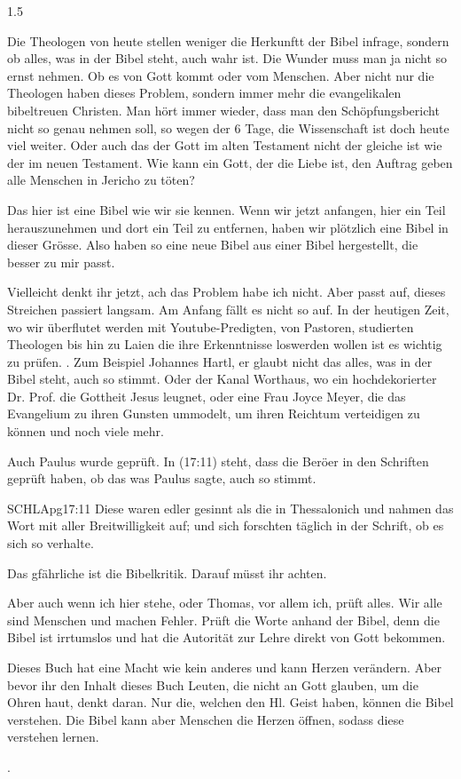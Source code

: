 \documentclass[fontsize=14pt]{mybib}
\begin{document}
\begin{spacing}{1.5}
\begin{otsblock}[Einführung]
    Die Theologen von heute stellen weniger die Herkunftt der Bibel infrage, sondern ob alles, was in der Bibel steht, auch wahr ist. Die Wunder muss man ja nicht so ernst nehmen. Ob es von Gott kommt oder vom Menschen. Aber nicht nur die Theologen haben dieses Problem, sondern immer mehr die evangelikalen bibeltreuen Christen. Man hört immer wieder, dass man den Schöpfungsbericht nicht so genau nehmen soll, so wegen der 6 Tage, die Wissenschaft ist doch heute viel weiter. Oder auch das der Gott im alten Testament nicht der gleiche ist wie der im neuen Testament. Wie kann ein Gott, der die Liebe ist, den Auftrag geben alle Menschen in Jericho zu töten?

    Das hier ist eine Bibel wie wir sie kennen. Wenn wir jetzt anfangen, hier ein Teil herauszunehmen und dort ein Teil zu entfernen, haben wir plötzlich eine Bibel in dieser Grösse. Also haben so eine neue Bibel aus einer Bibel hergestellt, die  besser zu mir passt.
    
    Vielleicht denkt ihr jetzt, ach das Problem habe ich nicht. Aber passt auf, dieses Streichen passiert langsam. Am Anfang fällt es nicht so auf. In der heutigen Zeit, wo wir überflutet werden mit Youtube-Predigten, von Pastoren,  studierten Theologen bis hin zu Laien die ihre Erkenntnisse loswerden wollen ist es wichtig zu prüfen. . Zum Beispiel Johannes Hartl, er glaubt nicht das alles, was in der Bibel steht, auch so stimmt. Oder der Kanal Worthaus, wo ein hochdekorierter Dr. Prof. die Gottheit Jesus leugnet, oder eine Frau Joyce Meyer, die das Evangelium zu ihren Gunsten ummodelt, um ihren Reichtum verteidigen zu können und noch viele mehr. 

    Auch Paulus wurde geprüft. In (17:11) steht, dass die Beröer in den Schriften geprüft haben, ob das was Paulus sagte, auch so stimmt.

    \begin{bibelbox}{SCHL}{Apg}{17:11}
    Diese waren edler gesinnt als die in Thessalonich und nahmen das Wort mit aller Breitwilligkeit auf; und sich forschten täglich in der Schrift, ob es sich so verhalte.
    \end{bibelbox}

    Das gfährliche ist die Bibelkritik. Darauf müsst ihr achten.
    
    Aber auch wenn ich hier stehe, oder Thomas, vor allem ich, prüft alles. Wir alle sind Menschen und machen Fehler. Prüft die Worte anhand der Bibel, denn die Bibel ist irrtumslos und hat die Autorität zur Lehre direkt von Gott bekommen.

    Dieses Buch hat eine Macht wie kein anderes und kann Herzen verändern. Aber bevor ihr den Inhalt dieses Buch Leuten, die nicht an Gott glauben, um die Ohren haut, denkt daran. Nur die, welchen den Hl. Geist haben, können die Bibel verstehen. Die Bibel kann aber Menschen die Herzen öffnen, sodass diese verstehen lernen.
    \end{otsblock}

    .
   
\end{spacing}
\end{document}
